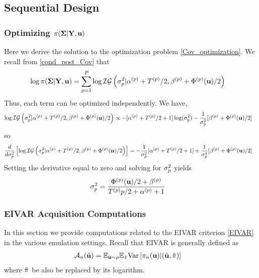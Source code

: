 \documentclass[12pt]{article}
\begin{document}
\subsection{Sequential Design}
\subsubsection{Optimizing $\pi(\boldsymbol{\Sigma}|\mathbf{Y}, \mathbf{u})$}
Here we derive the solution to the optimization problem \ref{Cov_optimization}. We recall from \ref{cond_post_Cov} that 
\begin{align*}
\log \pi(\boldsymbol{\Sigma}|\mathbf{Y}, \mathbf{u}) &= \sum_{p = 1}^{P} \log \mathcal{IG}\left(\sigma_{p}^2|{\alpha}^{(p)} + {T}^{(p)}/2, {\beta}^{(p)} + {\Phi}^{(p)}(\mathbf{u})/2 \right)
\end{align*}
Thus, each term can be optimized independently. We have, 
\begin{align*}
\log \mathcal{IG}\left(\sigma_{p}^2|{\alpha}^{(p)} + {T}^{(p)}/2, {\beta}^{(p)} + {\Phi}^{(p)}(\mathbf{u})/2 \right) &\propto -[{\alpha}^{(p)} + {T}^{(p)}/2 + 1]\log(\sigma^2_{p})
																									       - \frac{1}{\sigma^2_{p}} [{\beta}^{(p)} + {\Phi}^{(p)}(\mathbf{u})/2]
\end{align*}
so 
\begin{align*}
\frac{d}{d\sigma_{p}^2}\left[\log \mathcal{IG}\left(\sigma_{p}^2|{\alpha}^{(p)} + {T}^{(p)}/2, {\beta}^{(p)} + {\Phi}^{(p)}(\mathbf{u})/2 \right)\right] &= -\frac{1}{\sigma_{p}^2}[{\alpha}^{(p)} + {T}^{(p)}/2 + 1] + \frac{1}{\sigma_{p}^4} [{\beta}^{(p)} + {\Phi}^{(p)}(\mathbf{u})/2]
\end{align*}
Setting the derivative equal to zero and solving for $\sigma^2_{p}$ yields
\begin{align*}
\sigma_{p}^2 &= \frac{{\Phi}^{(p)}(\mathbf{u})/2 + {\beta}^{(p)}}{{T}^{(p)}{p}/2 + {\alpha}^{(p)} + 1}
\end{align*}


\subsubsection{EIVAR Acquisition Computations}
In this section we provide computations related to the EIVAR criterion \ref{EIVAR} in the various emulation settings. Recall that EIVAR is generally defined as 
\begin{align*}
\mathcal{A}_{n}(\tilde{\mathbf{u}}) &= \mathbb{E}_{\mathbf{u} \sim \rho} \mathbb{E}_{\tilde{\pi}} \mathrm{Var}\left[\pi_{n}(\mathbf{u}) | (\tilde{\mathbf{u}}, \tilde{\pi}) \right] 
\end{align*}
where $\tilde{\pi}$ be also be replaced by its logarithm. 
\end{document}
